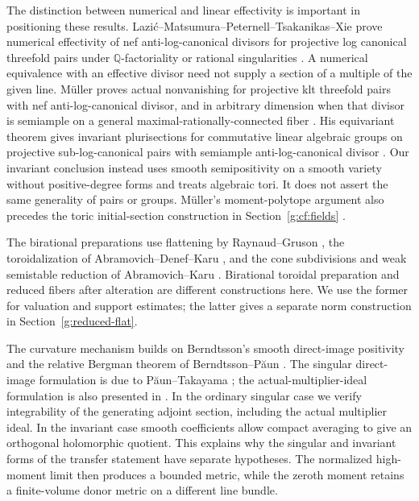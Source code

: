 The distinction between numerical and linear effectivity is important
in positioning these results. Lazi\'c--Matsumura--Peternell--Tsakanikas--Xie
prove numerical effectivity of nef anti-log-canonical divisors for projective
log canonical threefold pairs under $\mathbb Q$-factoriality or rational
singularities \cite[Theorem~A]{LMPTX2023}. A numerical equivalence with
an effective divisor need not supply a section of a multiple of the
given line. M\"uller proves actual nonvanishing for projective klt
threefold pairs with nef anti-log-canonical divisor, and in arbitrary
dimension when that divisor is semiample on a general
maximal-rationally-connected fiber
\cite[Theorem~A and Corollary~B]{Muller2025}.
His equivariant theorem gives invariant plurisections for commutative
linear algebraic groups on projective sub-log-canonical pairs with
semiample anti-log-canonical divisor \cite[Theorem~C]{Muller2025}.
Our invariant conclusion instead uses smooth semipositivity on a
smooth variety without positive-degree forms and treats algebraic
tori. It does not assert the same generality of pairs or groups.
M\"uller's moment-polytope argument also precedes the toric initial-section
construction in Section~\ref{g:cf:fields}
\cite[Proposition~3.13 and Corollary~3.14]{Muller2025}.

The birational preparations use flattening by Raynaud--Gruson
\cite{RaynaudGruson1971}, the toroidalization of
Abramovich--Denef--Karu \cite{ADK2013}, and the cone subdivisions and
weak semistable reduction of Abramovich--Karu \cite{AK2000}.
Birational toroidal preparation and reduced fibers after alteration are
different constructions here. We use the former for valuation and
support estimates; the latter gives a separate norm construction in
Section~\ref{g:reduced-flat}.

The curvature mechanism builds on Berndtsson's smooth direct-image
positivity \cite[Theorem~1.2]{Berndtsson2009} and the relative Bergman
theorem of Berndtsson--P\u aun \cite[Theorem~0.1]{BerndtssonPaun2008}.
The singular direct-image formulation is due to P\u aun--Takayama
\cite[Theorem~3.3.5]{PT2018}; the actual-multiplier-ideal formulation is
also presented in \cite[Theorem~21.1]{HPS}. In the ordinary singular case
we verify integrability of the generating adjoint section, including
the actual multiplier ideal. In the invariant case smooth coefficients
allow compact averaging to give an orthogonal holomorphic quotient.
This explains why the singular and invariant forms of the transfer
statement have separate hypotheses. The normalized high-moment limit
then produces a bounded metric, while the zeroth moment retains a
finite-volume donor metric on a different line bundle.

